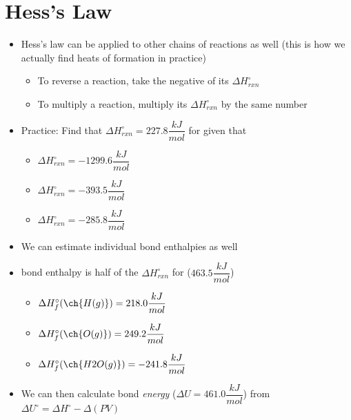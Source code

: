 \documentclass[12pt, openany, letterpaper]{memoir}
\begin{document}
\section*{Hess's Law}
\begin{itemize}
	\item Hess's law can be applied to other chains of reactions as well (this is how we actually find heats of formation in practice)
	\begin{itemize}
		\item To reverse a reaction, take the negative of its $\Delta H^\circ_{rxn}$
		\item To multiply a reaction, multiply its $\Delta H^\circ_{rxn}$ by the same number
	\end{itemize}
	\item Practice: Find that $\Delta H^\circ_{rxn} = 227.8\dfrac{kJ}{mol}$ for  given that
	\begin{itemize}
		\item {} \hspace{2em} $\Delta H^\circ_{rxn} = -1299.6 \dfrac{kJ}{mol}$
		\item {} \hspace{2em} $\Delta H^\circ_{rxn} = -393.5 \dfrac{kJ}{mol}$
		\item {} \hspace{2em} $\Delta H^\circ_{rxn} = -285.8 \dfrac{kJ}{mol}$
	\end{itemize}
	\item We can estimate individual bond enthalpies as well
	\item {} bond enthalpy is half of the $\Delta H^\circ_{rxn}$ for  ($463.5\dfrac{kJ}{mol}$)
	\begin{itemize}
		\item $\Delta H^\circ_{f}(\ch{H(g)}) = 218.0 \dfrac{kJ}{mol}$
		\item $\Delta H^\circ_{f}(\ch{O(g)}) = 249.2 \dfrac{kJ}{mol}$
		\item $\Delta H^\circ_{f}(\ch{H2O(g)}) = -241.8 \dfrac{kJ}{mol}$
	\end{itemize}
	\item We can then calculate bond \emph{energy} ($\Delta U = 461.0\dfrac{kJ}{mol}$) from $\Delta U^\circ = \Delta H^\circ - \Delta(PV)$
\end{itemize}
\end{document}
